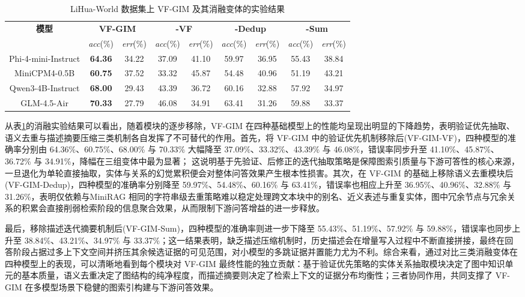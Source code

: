 \documentclass[promaster, vlined]{DissertUESTC}
\begin{document}
\begin{table}[!ht]
\centering
\caption{LiHua-World 数据集上 VF-GIM 及其消融变体的实验结果}
\label{tab:vfgim_ablation}
\setlength{\tabcolsep}{2.4pt}
\small
\begin{tabular*}{\textwidth}{@{\extracolsep{\fill}}ccccccccc}
\toprule
\multirow{2}{*}{\textbf{模型}} & \multicolumn{2}{c}{\textbf{VF-GIM}} & \multicolumn{2}{c}{\textbf{-VF}} & \multicolumn{2}{c}{\textbf{-Dedup}} & \multicolumn{2}{c}{\textbf{-Sum}} \\
\cmidrule(lr){2-3} \cmidrule(lr){4-5} \cmidrule(lr){6-7} \cmidrule(lr){8-9}
& \textit{acc}(\%) & \textit{err}(\%) & \textit{acc}(\%) & \textit{err}(\%) & \textit{acc}(\%) & \textit{err}(\%) & \textit{acc}(\%) & \textit{err}(\%) \\
\midrule
Phi-4-mini-Instruct & \textbf{64.36} & 34.22 & 37.09 & 41.10 & 59.97 & 36.95 & 55.43 & 38.84 \\
MiniCPM4-0.5B & \textbf{60.75} & 37.52 & 33.32 & 45.87 & 54.48 & 40.96 & 51.19 & 43.21 \\
Qwen3-4B-Instruct & \textbf{68.00} & 29.43 & 43.39 & 36.72 & 60.16 & 32.88 & 57.92 & 34.97 \\
GLM-4.5-Air & \textbf{70.33} & 27.79 & 46.08 & 34.91 & 63.41 & 31.26 & 59.88 & 33.37 \\
\bottomrule
\end{tabular*}
\end{table}

从表\ref{tab:vfgim_ablation}的消融实验结果可以看出，随着模块的逐步移除，VF-GIM 在四种基础模型上的性能均呈现出明显的下降趋势，表明验证优先抽取、语义去重与描述摘要压缩三类机制各自发挥了不可替代的作用。首先，将 VF-GIM 中的验证优先机制移除后(VF-GIM-VF)，四种模型的准确率分别由 64.36\%、60.75\%、68.00\% 与 70.33\% 大幅降至 37.09\%、33.32\%、43.39\% 与 46.08\%，错误率同步升至 41.10\%、45.87\%、36.72\% 与 34.91\%，降幅在三组变体中最为显著；
这说明基于先验证、后修正的迭代抽取策略是保障图索引质量与下游可答性的核心来源，一旦退化为单轮直接抽取，实体与关系的幻觉累积便会对整体问答效果产生根本性损害。其次，在 VF-GIM 的基础上移除语义去重模块后(VF-GIM-Dedup)，四种模型的准确率分别降至 59.97\%、54.48\%、60.16\% 与 63.41\%，错误率也相应上升至 36.95\%、40.96\%、32.88\% 与 31.26\%，表明仅依赖与MiniRAG 相同的字符串级去重策略难以稳定处理跨文本块中的别名、近义表述与重复实体，图中冗余节点与冗余关系的积累会直接削弱检索阶段的信息聚合效果，从而限制下游问答增益的进一步释放。

最后，移除描述迭代摘要机制后(VF-GIM-Sum)，四种模型的准确率则进一步下降至 55.43\%、51.19\%、57.92\% 与 59.88\%，错误率也同步上升至 38.84\%、43.21\%、34.97\% 与 33.37\%；这一结果表明，缺乏描述压缩机制时，历史描述会在增量写入过程中不断直接拼接，最终在回答阶段占据过多上下文空间并挤压其余候选证据的可见范围，对小模型的多跳证据并置能力尤为不利。综合来看，通过对比三类消融变体在四种模型上的表现，可以清晰地看到每个模块对 VF-GIM 最终性能的独立贡献：基于验证优先策略的实体关系抽取模块决定了图中知识单元的基本质量，语义去重决定了图结构的纯净程度，而描述摘要则决定了检索上下文的证据分布均衡性；三者协同作用，共同支撑了 VF-GIM 在多模型场景下稳健的图索引构建与下游问答效果。
\end{document}
